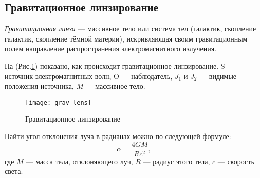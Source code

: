 \subsection{Гравитационное линзирование}

\textit{Гравитационная линза} --- массивное тело или система тел (галактик, скопление галактик, скопление тёмной материи), искривляющая своим гравитационным полем направление распространения электромагнитного излучения.

На (Рис.\ref{grav-lens}) показано, как происходит гравитационное линзирование. S --- источник электромагнитных волн, O --- наблюдатель, $J_1$ и $J_2$ --- видимые положения источника, $M$ --- массивное тело.

\begin{figure}[h!]
\begin{center}
\texttt{[image: grav-lens]}
\caption{Гравитационное линзирование}\label{grav-lens}
\end{center}
\end{figure}

Найти угол отклонения луча в радианах можно по следующей формуле:
\begin{equation}
\alpha=\frac{4GM}{Rc^2},
\end{equation}
где $M$ --- масса тела, отклоняющего луч, $R$ --- радиус этого тела, $c$ --- скорость света.